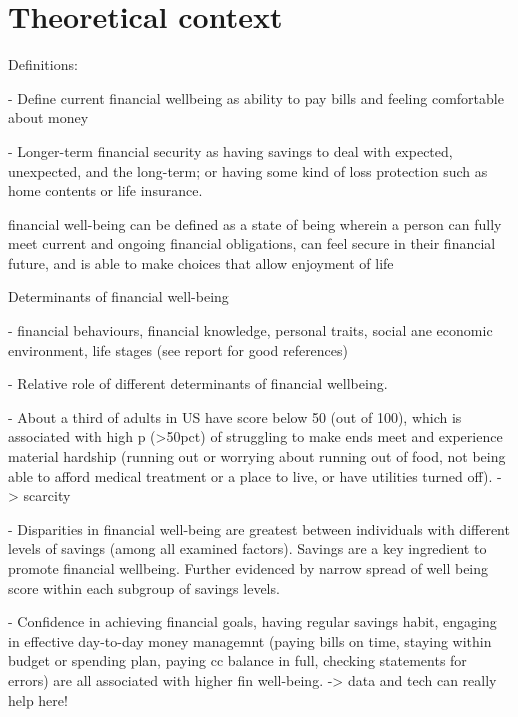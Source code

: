 
\section{Theoretical context}%
\label{sec:theoretical_context}



Definitions:


\citet{mps2018building}
- Define current financial wellbeing as ability to pay bills and feeling
comfortable about money

- Longer-term financial security as having savings to deal with expected,
unexpected, and the long-term; or having some kind of loss protection such as
home contents or life insurance.


\citet{cfpb2015financial}
financial well-being can be defined as a state of being wherein a person can fully meet current and ongoing financial obligations, can feel secure in their financial future, and is able to make choices that allow enjoyment of life


Determinants of financial well-being

\citet{cfpb2015financial}
- financial behaviours, financial knowledge, personal traits, social ane economic
environment, life stages (see report for good references)

\citet{cfpb2017financial}
- Relative role of different determinants of financial wellbeing.

- About a third of adults in US have score below 50 (out of 100), which is
associated with high p (>50pct) of struggling to make ends meet and experience
material hardship (running out or worrying about running out of food, not being
able to afford medical treatment or a place to live, or have utilities turned
off). -> scarcity 

- Disparities in financial well-being are greatest between individuals with
different levels of savings (among all examined factors). Savings are a key
ingredient to promote financial wellbeing. Further evidenced by narrow spread
of well being score within each subgroup of savings levels. 

- Confidence in achieving financial goals, having regular savings habit,
engaging in effective day-to-day money managemnt (paying bills on time, staying
within budget or spending plan, paying cc balance in full, checking statements
for errors) are all associated with higher fin well-being. -> data and tech can
really help here!

